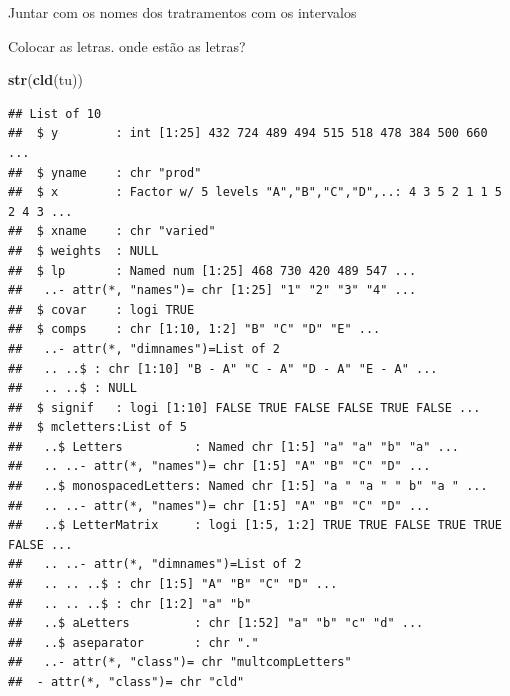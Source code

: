\documentclass[
]{book}
\newenvironment{Shaded}{\begin{snugshade}}{\end{snugshade}}
\newcommand{\KeywordTok}[1]{\textcolor[rgb]{0.13,0.29,0.53}{\textbf{#1}}}
\newcommand{\NormalTok}[1]{#1}
\newcommand{\OperatorTok}[1]{\textcolor[rgb]{0.81,0.36,0.00}{\textbf{#1}}}
\newcommand{\StringTok}[1]{\textcolor[rgb]{0.31,0.60,0.02}{#1}}
\begin{document}
Juntar com os nomes dos tratramentos com os intervalos

\begin{Shaded}
\end{Shaded}

Colocar as letras. onde estão as letras?

\begin{Shaded}
\begin{Highlighting}[]
\KeywordTok{str}\NormalTok{(}\KeywordTok{cld}\NormalTok{(tu))}
\end{Highlighting}
\end{Shaded}

\begin{verbatim}
## List of 10
##  $ y        : int [1:25] 432 724 489 494 515 518 478 384 500 660 ...
##  $ yname    : chr "prod"
##  $ x        : Factor w/ 5 levels "A","B","C","D",..: 4 3 5 2 1 1 5 2 4 3 ...
##  $ xname    : chr "varied"
##  $ weights  : NULL
##  $ lp       : Named num [1:25] 468 730 420 489 547 ...
##   ..- attr(*, "names")= chr [1:25] "1" "2" "3" "4" ...
##  $ covar    : logi TRUE
##  $ comps    : chr [1:10, 1:2] "B" "C" "D" "E" ...
##   ..- attr(*, "dimnames")=List of 2
##   .. ..$ : chr [1:10] "B - A" "C - A" "D - A" "E - A" ...
##   .. ..$ : NULL
##  $ signif   : logi [1:10] FALSE TRUE FALSE FALSE TRUE FALSE ...
##  $ mcletters:List of 5
##   ..$ Letters          : Named chr [1:5] "a" "a" "b" "a" ...
##   .. ..- attr(*, "names")= chr [1:5] "A" "B" "C" "D" ...
##   ..$ monospacedLetters: Named chr [1:5] "a " "a " " b" "a " ...
##   .. ..- attr(*, "names")= chr [1:5] "A" "B" "C" "D" ...
##   ..$ LetterMatrix     : logi [1:5, 1:2] TRUE TRUE FALSE TRUE TRUE FALSE ...
##   .. ..- attr(*, "dimnames")=List of 2
##   .. .. ..$ : chr [1:5] "A" "B" "C" "D" ...
##   .. .. ..$ : chr [1:2] "a" "b"
##   ..$ aLetters         : chr [1:52] "a" "b" "c" "d" ...
##   ..$ aseparator       : chr "."
##   ..- attr(*, "class")= chr "multcompLetters"
##  - attr(*, "class")= chr "cld"
\end{verbatim}

\begin{Shaded}
\end{Shaded}
\end{document}
